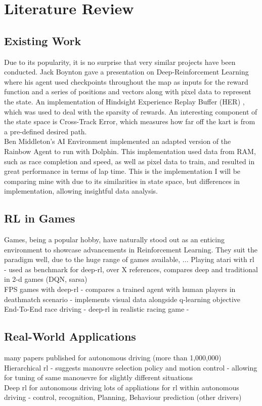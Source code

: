 \chapter{Literature Review}
\section{Existing Work}
Due to its popularity, it is no surprise that very similar projects have been conducted. Jack Boynton gave a presentation on Deep-Reinforcement Learning \cite{JackWBoynton} where his agent used checkpoints throughout the map as inputs for the reward function and a series of positions and vectors along with pixel data to represent the state. An implementation of Hindsight Experience Replay Buffer (HER) \cite{andrychowicz2017hindsight} , which was used to deal with the sparsity of rewards. An interesting component of the state space is Cross-Track Error, which measures how far off the kart is from a pre-defined desired path. \\Ben Middleton's AI Environment \cite{BenJMiddleton} implemented an adapted version of the Rainbow Agent \cite{RainbowAgent} \cite{hessel2018rainbow} to run with Dolphin. This implementation used data from RAM, such as race completion and speed, as well as pixel data to train, and resulted in great performance in terms of lap time. This is the implementation I will be comparing mine with due to its similarities in state space, but differences in implementation, allowing insightful data analysis. 
\section{RL in Games}
Games, being a popular hobby, have naturally stood out as an enticing environment to showcase advancements in Reinforcement Learning. They suit the paradigm well, due to the huge range of games available, ...
\cite{mnih2013playing}Playing atari with rl - used as benchmark for deep-rl, over X references, compares deep and traditional in 2-d games (DQN, sarsa)\\FPS games with deep-rl - compares a trained agent with human players in deathmatch scenario - implements visual data alongside q-learning objective\cite{lample2017playing}\\End-To-End race driving - deep-rl in realistic racing game\cite{8460934} -
\section{Real-World Applications}
many papers published for autonomous driving (more than 1,000,000) 
\\Hierarchical rl - suggests manouvre selection policy and motion control - allowing for tuning of same manouevre for slightly different situations\cite{duan2020hierarchical}
\\Deep rl for autonomous driving \cite{kiran2021deep} lots of appliations for rl within autonomous driving - control, recognition, Planning, Behaviour prediction (other drivers)